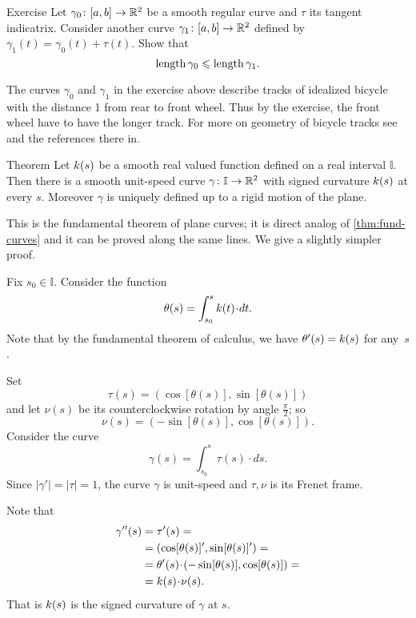\begin{thm}{Exercise}\label{ex:bike}
Let $\gamma_0\colon[a,b]\to\mathbb{R}^2$ be a smooth regular curve and $\tau$ its tangent indicatrix.
Consider another curve $\gamma_1\colon[a,b]\to\mathbb{R}^2$ defined by $\gamma_1(t)=\gamma_0(t)+\tau(t)$.
Show that
\[\mathop{\rm length}\nolimits\gamma_0\leqslant \mathop{\rm length}\nolimits\gamma_1.\]

\end{thm}

The curves $\gamma_0$ and $\gamma_1$ in the exercise above describe tracks of idealized bicycle with the distance 1 from rear to front wheel.
Thus by the exercise, the front wheel have to have the longer track.
For more on geometry of bicycle tracks see \cite{FLT} and the references there in.

\begin{thm}{Theorem}\label{thm:fund-curves-2D}
Let $k(s)$ be a smooth real valued function defined on a real interval $\mathbb{I}$.
Then there is a smooth unit-speed curve $\gamma\colon\mathbb{I}\to\mathbb{R}^2$ with signed curvature $k(s)$ at every $s$.
Moreover $\gamma$ is uniquely defined up to a rigid motion of the plane.
\end{thm}

This is the fundamental theorem of plane curves; it is direct analog of \ref{thm:fund-curves} and it can be proved along the same lines.
We give a slightly simpler proof.

Fix $s_0\in\mathbb{I}$.
Consider the function
\[\theta(s)=\int_{s_0}^s\skur(t)\cdot dt.\]
Note that by the fundamental theorem of calculus, we have $\theta'(s)\z=\skur(s)$ for any~$s$.

Set 
\[\tau(s)=(\cos[\theta(s)],\sin[\theta(s)])\] and let $\nu(s)$ be its counterclockwise rotation by angle $\tfrac\pi2$; so 
\[\nu(s)=(-\sin[\theta(s)],\cos[\theta(s)]).\]
Consider the curve 
\[\gamma(s)=\int_{s_0}^s\tau(s)\cdot ds.\]
Since $|\gamma'|=|\tau|=1$, the curve $\gamma$ is unit-speed and $\tau,\nu$ is its Frenet frame. 

Note that
\begin{align*}
\gamma''(s)&=\tau'(s)=
\\
&=(\cos[\theta(s)]',\sin[\theta(s)]')=
\\
&=\theta'(s)\cdot (-\sin[\theta(s)],\cos[\theta(s)])=
\\
&=\skur(s)\cdot \nu(s).
\end{align*}
That is $k(s)$ is the signed curvature of $\gamma$ at $s$.

